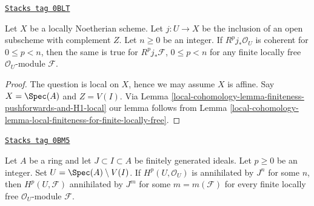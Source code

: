 \begin{lemma}
\label{local-cohomology-lemma-finiteness-for-finite-locally-free}
\href{https://stacks.math.columbia.edu/tag/0BLT}{\texttt{Stacks tag 0BLT}}

Let $X$ be a locally Noetherian scheme. Let $j : U \to X$ be the inclusion
of an open subscheme with complement $Z$. Let $n \geq 0$ be an integer.
If $R^pj_*\mathcal{O}_U$ is coherent for $0 \leq p < n$, then
the same is true for $R^pj_*\mathcal{F}$, $0 \leq p < n$
for any finite locally free $\mathcal{O}_U$-module $\mathcal{F}$.
\end{lemma}

\begin{proof}
The question is local on $X$, hence we may assume $X$ is affine.
Say $X = \Spec(A)$ and $Z = V(I)$. Via
Lemma \ref{local-cohomology-lemma-finiteness-pushforwards-and-H1-local}
our lemma follows from
Lemma \ref{local-cohomology-lemma-local-finiteness-for-finite-locally-free}.
\end{proof}

\begin{lemma}[Annihilate Hp]
\label{local-cohomology-lemma-annihilate-Hp}
\href{https://stacks.math.columbia.edu/tag/0BM5}{\texttt{Stacks tag 0BM5}}

\begin{reference}
\cite[Lemma 1.9]{Bhatt-local}
\end{reference}
Let $A$ be a ring and let $J \subset I \subset A$ be finitely generated ideals.
Let $p \geq 0$ be an integer. Set $U = \Spec(A) \setminus V(I)$. If
$H^p(U, \mathcal{O}_U)$ is annihilated by $J^n$ for some $n$, then
$H^p(U, \mathcal{F})$ annihilated by $J^m$ for some $m = m(\mathcal{F})$
for every finite locally free $\mathcal{O}_U$-module $\mathcal{F}$.
\end{lemma}

